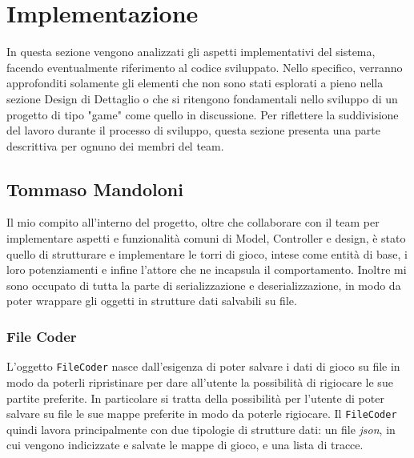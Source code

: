 \section{Implementazione}
In questa sezione vengono analizzati gli aspetti implementativi del sistema, facendo eventualmente riferimento al codice
sviluppato. Nello specifico, verranno approfonditi solamente gli elementi che non sono stati esplorati a pieno nella
sezione Design di Dettaglio o che si ritengono fondamentali nello sviluppo di un progetto di tipo "game" come quello in
discussione. Per riflettere la suddivisione del lavoro durante il processo di sviluppo, questa sezione presenta una
parte descrittiva per ognuno dei membri del team.

\subsection{Tommaso Mandoloni}
Il mio compito all'interno del progetto, oltre che collaborare con il team per implementare aspetti e funzionalità
comuni di Model, Controller e design, è stato quello di strutturare e implementare le torri di gioco, intese come entità
di base, i loro potenziamenti e infine l'attore che ne incapsula il comportamento. Inoltre mi sono occupato di tutta
la parte di serializzazione e deserializzazione, in modo da poter wrappare gli oggetti in strutture dati salvabili su
file.

\subsubsection{File Coder}
L'oggetto \texttt{FileCoder} nasce dall'esigenza di poter salvare i dati di gioco su file in modo da poterli
ripristinare per dare all'utente la possibilità di rigiocare le sue partite preferite. In particolare si tratta della
possibilità per l'utente di poter salvare su file le sue mappe preferite in modo da poterle rigiocare. Il
\texttt{FileCoder} quindi lavora principalmente con due tipologie di strutture dati: un file \textit{json}, in cui
vengono indicizzate e salvate le mappe di gioco, e una lista di tracce.

